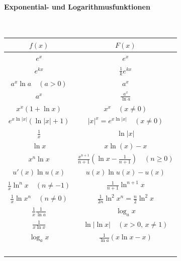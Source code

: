 \documentclass[a4paper,10pt]{article}
\begin{document}
\paragraph{Exponential- und Logarithmusfunktionen} \
\begin{table}[H]
    \centering
    \begin{tabular}{cc}
         \( f(x) \) & \( F(x) \) \\
         \hline \hline
         \( e^x \) & \( e^x \) \\
         \hline
         \( e^{kx} \) & \( \frac{1}{k} e^{kx} \) \\
         \hline
         \( a^x \ln a \quad (a > 0) \) & \( a^x \) \\
         \hline
         \( a^x \) & \( \frac{a^x}{\ln a} \) \\
         \hline
         \( x^x(1 + \ln x) \) & \( x^x \quad (x \neq 0) \) \\
         \hline
         \( e^{x \ln \lvert x \rvert}(\ln \lvert x \rvert + 1) \) & \( \lvert x \rvert^x = e^{x \ln \lvert x \rvert} \quad (x \neq 0) \) \\
         \hline
         \( \frac{1}{x} \) & \( \ln \lvert x \rvert \) \\
         \hline
         \( \ln x \) & \( x \ln(x) - x \) \\
         \hline
         \( x^n \ln x \) & \( \frac{x^{n + 1}}{n + 1} \left( \ln x - \frac{1}{n + 1} \right) \quad (n \geq 0) \) \\
         \hline
         \( u'(x) \ln u(x) \) & \( u(x) \ln u(x) - u(x) \) \\
         \hline
         \( \frac{1}{x} \ln^n x \quad (n \neq -1) \) & \( \frac{1}{n + 1} \ln^{n + 1} x \) \\
         \hline
         \( \frac{1}{x} \ln x^n \quad (n \neq 0) \) & \( \frac{1}{2n} \ln^2 x^n = \frac{n}{2} \ln^2 x \) \\
         \hline
         \( \frac{1}{x} \frac{1}{\ln a} \) & \( \log_a x \) \\
         \hline
         \( \frac{1}{x \ln x} \) & \( \ln \lvert \ln x \rvert \quad (x > 0, \, x \neq 1) \) \\
         \hline
         \( \log_a x \) & \( \frac{1}{\ln a} (x \ln x - x) \) \\
         \hline
         \(  \) & \(  \) \\
    \end{tabular}
\end{table}
\end{document}
